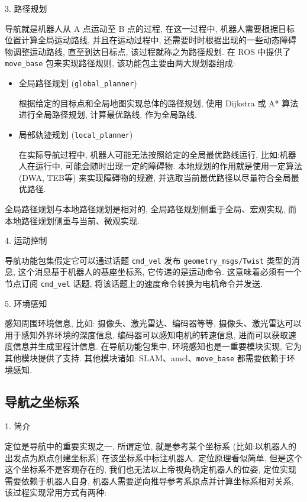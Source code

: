 \documentclass[openany, fontset=windowsold]{ctexbook}
\theoremstyle{kaiti}
\theoremstyle{normal}
\begin{document}
3. 路径规划

导航就是机器人从 A 点运动至 B 点的过程, 在这一过程中, 机器人需要根据目标位置计算全局运动路线, 并且在运动过程中, 还需要时时根据出现的一些动态障碍物调整运动路线, 直至到达目标点, 该过程就称之为路径规划. 在 ROS 中提供了 \verb|move_base| 包来实现路径规则, 该功能包主要由两大规划器组成:

\begin{itemize}
  \item 全局路径规划 (\verb|global_planner|)

  根据给定的目标点和全局地图实现总体的路径规划, 使用 Dijkstra 或 A* 算法进行全局路径规划, 计算最优路线, 作为全局路线.

  \item 局部轨迹规划 (\verb|local_planner|)

  在实际导航过程中, 机器人可能无法按照给定的全局最优路线运行, 比如:机器人在运行中, 可能会随时出现一定的障碍物. 本地规划的作用就是使用一定算法 (DWA, TEB等) 来实现障碍物的规避, 并选取当前最优路径以尽量符合全局最优路径.
\end{itemize}

全局路径规划与本地路径规划是相对的, 全局路径规划侧重于全局、宏观实现, 而本地路径规划侧重与当前、微观实现.

4. 运动控制

导航功能包集假定它可以通过话题 \verb|cmd_vel| 发布 \verb|geometry_msgs/Twist| 类型的消息, 这个消息基于机器人的基座坐标系, 它传递的是运动命令. 这意味着必须有一个节点订阅 \verb|cmd_vel| 话题, 将该话题上的速度命令转换为电机命令并发送.

5. 环境感知

感知周围环境信息, 比如: 摄像头、激光雷达、编码器等等, 摄像头、激光雷达可以用于感知外界环境的深度信息, 编码器可以感知电机的转速信息, 进而可以获取速度信息并生成里程计信息. 在导航功能包集中, 环境感知也是一重要模块实现, 它为其他模块提供了支持. 其他模块诸如: SLAM、amcl、\verb|move_base| 都需要依赖于环境感知.

\subsection{导航之坐标系}

1. 简介

定位是导航中的重要实现之一, 所谓定位, 就是参考某个坐标系 (比如:以机器人的出发点为原点创建坐标系) 在该坐标系中标注机器人. 定位原理看似简单, 但是这个这个坐标系不是客观存在的, 我们也无法以上帝视角确定机器人的位姿, 定位实现需要依赖于机器人自身, 机器人需要逆向推导参考系原点并计算坐标系相对关系, 该过程实现常用方式有两种:
\end{document}
